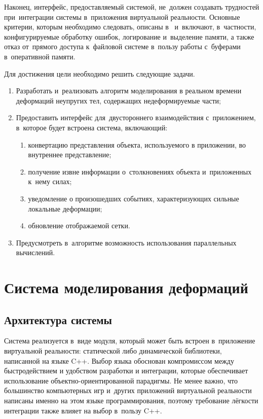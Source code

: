 \documentclass[a4paper, 14pt, titlepage]{extarticle}
\let\oldsection\section
\renewcommand{\section}{\newpage\oldsection}
\begin{document}
    Наконец, интерфейс, предоставляемый системой, не~должен создавать трудностей при~интеграции
    системы в~приложения виртуальной реальности. Основные критерии, которым необходимо следовать,
    описаны в~\cite{gems-middleware} и~включают, в~частности, конфигурируемые обработку ошибок,
    логирование и~выделение памяти, а также отказ от~прямого доступа к~файловой системе в~пользу
    работы с~буферами в~оперативной памяти.

    Для достижения цели необходимо решить следующие задачи.
    \begin{enumerate}
      \item Разработать и~реализовать алгоритм моделирования в реальном времени деформаций
        не\-у\-пру\-гих тел, содержащих недеформируемые части;
      \item Предоставить интерфейс для~двустороннего взаимодействия с~приложением, в~которое будет
        встроена система, включающий:
        \begin{enumerate}
          \item конвертацию представления объекта, используемого в приложении, во внутреннее представление;
          \item получение извне информации о~столкновениях объекта и~приложенных к~нему силах;
          \item уведомление о произошедших событиях, характеризующих сильные локальные деформации;
          \item обновление отображаемой сетки.
        \end{enumerate}
      \item Предусмотреть в~алгоритме возможность использования параллельных вычислений.
    \end{enumerate}

  \section{Система моделирования деформаций}
    \subsection{Архитектура системы}

      Система реализуется в~виде модуля, который может быть встроен в~приложение виртуальной
      реальности: статической либо динамической библиотеки, написанной на языке C++. Выбор языка
      обоснован компромиссом между быстродействием и удобством разработки и интеграции, которые
      обеспечивает использование объектно-ориентированной парадигмы. Не менее важно, что большинство
      компьютерных игр и~других приложений виртуальной реальности написаны именно на этом языке
      программирования, поэтому требование лёгкости интеграции также влияет на выбор в~пользу C++.
\end{document}
